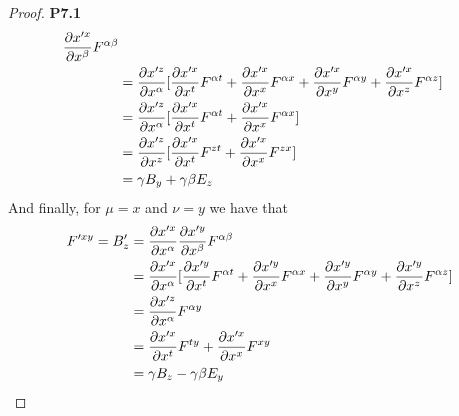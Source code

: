 \documentclass[11pt]{article}
\theoremstyle{definition}
\begin{document}
\begin{proof}{\textbf{P7.1}}
\begin{align*}
        \partialderivative{x'^x}{x^\beta} F^{\alpha\beta}\\
        &= \partialderivative{x'^z}{x^\alpha}[
            \partialderivative{x'^x}{x^t} F^{\alpha t}
            + \partialderivative{x'^x}{x^x} F^{\alpha x}
            + \partialderivative{x'^x}{x^y} F^{\alpha y}
            + \partialderivative{x'^x}{x^z} F^{\alpha z}
        ]\\
        &= \partialderivative{x'^z}{x^\alpha}[
            \partialderivative{x'^x}{x^t} F^{\alpha t}
            + \partialderivative{x'^x}{x^x} F^{\alpha x}
        ]\\
        &= \partialderivative{x'^z}{x^z}[
            \partialderivative{x'^x}{x^t} F^{z t}
            + \partialderivative{x'^x}{x^x} F^{z x}
        ]\\
        &= \gamma B_y + \gamma\beta E_z
    \end{align*}
    And finally, for $\mu=x$ and $\nu=y$ we have that
    \begin{align*}
        F'^{xy} = B'_z &= \partialderivative{x'^x}{x^\alpha}
        \partialderivative{x'^y}{x^\beta} F^{\alpha\beta}\\
        &= \partialderivative{x'^x}{x^\alpha}[
            \partialderivative{x'^y}{x^t} F^{\alpha t}
            + \partialderivative{x'^y}{x^x} F^{\alpha x}
            + \partialderivative{x'^y}{x^y} F^{\alpha y}
            + \partialderivative{x'^y}{x^z} F^{\alpha z}
        ]\\
        &= \partialderivative{x'^z}{x^\alpha} F^{\alpha y}\\
        &= \partialderivative{x'^x}{x^t}F^{t y}
        + \partialderivative{x'^x}{x^x}F^{x y}\\
        &= \gamma B_z - \gamma\beta E_y
    \end{align*}
\end{proof}
\cleardoublepage
\end{document}
